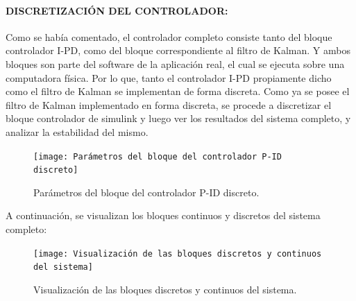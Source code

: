 \documentclass{article}
\begin{document}
\begin{sloppypar}



\paragraph{DISCRETIZACIÓN DEL CONTROLADOR:}
\label{sec:DISCRETIZACIÓN DEL CONTROLADOR:}
\hfill

\hfill

Como se había comentado, el controlador completo consiste tanto del bloque controlador I-PD, como del bloque correspondiente al filtro de Kalman. Y ambos bloques son parte del software de la aplicación real, el cual se ejecuta sobre una computadora física. Por lo que, tanto el controlador I-PD propiamente dicho como el filtro de Kalman se implementan de forma discreta. Como ya se posee el filtro de Kalman implementado en forma discreta, se procede a discretizar el bloque controlador de simulink y luego ver los resultados del sistema completo, y analizar la estabilidad del mismo.

\begin{figure}[H]
    \centering
    \texttt{[image: Parámetros del bloque del controlador P-ID discreto]}
    \caption{Parámetros del bloque del controlador P-ID discreto.}
    \label{fig:Parámetros del bloque del controlador P-ID discreto}
\end{figure}



A continuación, se visualizan los bloques continuos y discretos del sistema completo:

\begin{figure}[H]
    \centering
    \texttt{[image: Visualización de las bloques discretos y continuos del sistema]}
    \caption{Visualización de las bloques discretos y continuos del sistema.}
    \label{fig:Visualización de las bloques discretos y continuos del sistema}
\end{figure}


\end{sloppypar}
\end{document}
